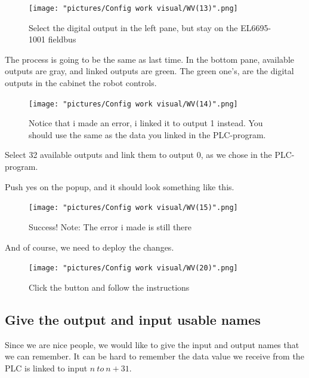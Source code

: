 \documentclass{article}
\begin{document}
\begin{figure}[!h]
    \centering
    \texttt{[image: "pictures/Config work visual/WV(13)".png]}
    \caption{Select the digital output in the left pane, but stay on the EL6695-1001 fieldbus }
   
\end{figure}

\newpage

The process is going to be the same as last time. In the bottom pane, available outputs are gray, and linked outputs are green. The green one's, are the digital outputs in the cabinet the robot controls. 

\begin{figure}[!h]
    \centering
    \texttt{[image: "pictures/Config work visual/WV(14)".png]}
    \caption{Notice that i made an error, i linked it to output 1 instead. You should use the same as the data you linked in the PLC-program.  }
   
\end{figure}

Select 32 available outputs and link them to output 0, as we chose in the PLC-program.

\newpage

Push yes on the popup, and it should look something like this.

\begin{figure}[!h]
    \centering
    \texttt{[image: "pictures/Config work visual/WV(15)".png]}
    \caption{Success! Note: The error i made is still there}
   
\end{figure}

\newpage

And of course, we need to deploy the changes.

\begin{figure}[!h]
    \centering
    \texttt{[image: "pictures/Config work visual/WV(20)".png]}
    \caption{Click the button and follow the instructions}
    
\end{figure}

\newpage

\subsection{Give the output and input usable names}
Since we are nice people, we would like to give the input and output names that we can remember. It can be hard to remember the data value we receive from the PLC is linked to input $n\:to\:n+31$. 
\end{document}
